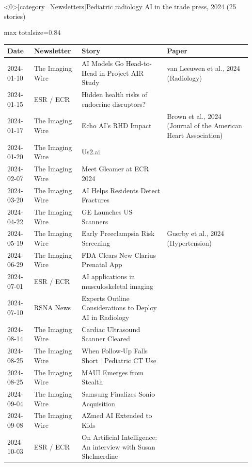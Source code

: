 \documentclass[aspectratio=169]{beamer}
\renewcommand{\arraystretch}{1.08}
\begin{document}
\begin{frame}<0>[category=Newsletters]{Pediatric radiology AI in the trade press, 2024 (25 stories)}
\tiny
\begin{adjustbox}{max totalsize={\textwidth}{0.84\textheight}}
\renewcommand{\arraystretch}{1.2}
\begin{tabular}{|l|l|>{\raggedright\arraybackslash}p{}|>{\raggedright\arraybackslash}p{}|}
\hline \textbf{Date} & \textbf{Newsletter} & \textbf{Story} & \textbf{Paper} \\ \hline
2024-01-10 & The Imaging Wire & AI Models Go Head-to-Head in Project AIR Study & van Leeuwen et al., 2024 (Radiology) \\ \hline
2024-01-15 & ESR / ECR & Hidden health risks of endocrine disruptors? &  \\ \hline
2024-01-17 & The Imaging Wire & Echo AI's RHD Impact & Brown et al., 2024 (Journal of the American Heart Association) \\ \hline
2024-01-20 & The Imaging Wire & Us2.ai &  \\ \hline
2024-02-07 & The Imaging Wire & Meet Gleamer at ECR 2024 &  \\ \hline
2024-03-20 & The Imaging Wire & AI Helps Residents Detect Fractures &  \\ \hline
2024-04-22 & The Imaging Wire & GE Launches US Scanners &  \\ \hline
2024-05-19 & The Imaging Wire & Early Preeclampsia Risk Screening & Guerby et al., 2024 (Hypertension) \\ \hline
2024-06-29 & The Imaging Wire & FDA Clears New Clarius Prenatal App &  \\ \hline
2024-07-01 & ESR / ECR & AI applications in musculoskeletal imaging &  \\ \hline
2024-07-10 & RSNA News & Experts Outline Considerations to Deploy AI in Radiology &  \\ \hline
2024-08-14 & The Imaging Wire & Cardiac Ultrasound Scanner Cleared &  \\ \hline
2024-08-25 & The Imaging Wire & When Follow-Up Falls Short | Pediatric CT Use &  \\ \hline
2024-08-25 & The Imaging Wire & MAUI Emerges from Stealth &  \\ \hline
2024-09-04 & The Imaging Wire & Samsung Finalizes Sonio Acquisition &  \\ \hline
2024-09-08 & The Imaging Wire & AZmed AI Extended to Kids &  \\ \hline
2024-10-03 & ESR / ECR & On Artificial Intelligence: An interview with Susan Shelmerdine &  \\ \hline

\end{tabular}
\end{adjustbox}
\end{frame}
\end{document}
